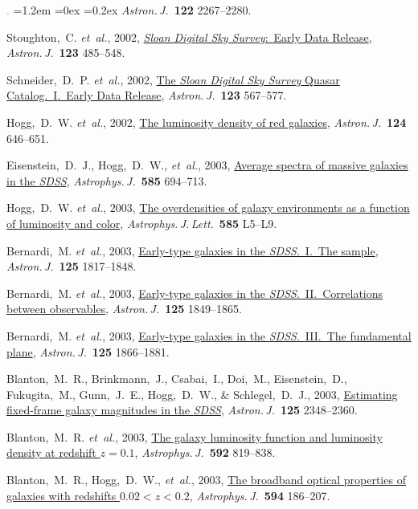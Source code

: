 \documentclass[10pt,letterpaper]{article}
\newcommand{\acronym}[1]{{\small{#1}}}
\newcommand{\foreign}[1]{\textsl{#1}}
\newcommand{\etal}{\foreign{et~al.}}
\newcommand{\project}[1]{\textsl{#1}}
\newcommand{\doi}[2]{\href{http://dx.doi.org/#1}{{#2}}}
\newcommand{\deemph}[1]{\textcolor{grey}{\footnotesize{#1}}}
\newcommand{\pubnumber}[1]{\deemph{{#1}.}}
\newcounter{refpubnum}
\newcommand{\hogglist}{%
    \rightmargin=0in
    \leftmargin=1.2em
    \topsep=0ex
    \partopsep=0pt
    \itemsep=0.2ex
    \parsep=0pt
    \itemindent=-1.0\leftmargin
    \listparindent=0.0\leftmargin
    \settowidth{\labelsep}{~}
    \usecounter{refpubnum}
  }
\begin{document}
\begin{list}{\pubnumber{\therefpubnum}}{\hogglist}
\textit{Astron.\,J.}\ \textbf{122} 2267--2280.
\item
Stoughton,~C. \etal, 2002,
\doi{10.1086/324741}{\project{Sloan Digital Sky Survey}:\ Early Data Release},
\textit{Astron.\,J.}\ \textbf{123} 485--548.
\item
Schneider,~D.~P. \etal, 2002,
\doi{10.1086/338434}{The \project{Sloan Digital Sky Survey} Quasar Catalog.\ \acronym{I}.\ Early Data Release},
\textit{Astron.\,J.}\ \textbf{123} 567--577.
\item
Hogg,~D.~W. \etal, 2002,
\doi{10.1086/341392}{The luminosity density of red galaxies},
\textit{Astron.\,J.}\ \textbf{124} 646--651.
\item
Eisenstein,~D.~J., Hogg,~D.~W., \etal, 2003,
\doi{10.1086/346233}{Average spectra of massive galaxies in the \project{\acronym{SDSS}}},
\textit{Astrophys.\,J.}\ \textbf{585} 694--713.
\item
Hogg,~D.~W. \etal, 2003,
\doi{10.1086/374238}{The overdensities of galaxy environments as a function of luminosity and color},
\textit{Astrophys.\,J.\,Lett.}\
\textbf{585} L5--L9.
\item
Bernardi,~M. \etal, 2003,
\doi{10.1086/367776}{Early-type galaxies in the \project{\acronym{SDSS}}.\ \acronym{I}.\ The sample},
\textit{Astron.\,J.}\ \textbf{125} 1817--1848.
\item
Bernardi,~M. \etal, 2003,
\doi{10.1086/374256}{Early-type galaxies in the \project{\acronym{SDSS}}.\ \acronym{II}.\ Correlations between observables},
\textit{Astron.\,J.}\ \textbf{125} 1849--1865.
\item
Bernardi,~M. \etal, 2003,
\doi{10.1086/367794}{Early-type galaxies in the \project{\acronym{SDSS}}.\ \acronym{III}.\ The fundamental plane},
\textit{Astron.\,J.}\ \textbf{125} 1866--1881.
\item
Blanton,~M.~R., Brinkmann,~J., Csabai,~I., Doi,~M., Eisenstein,~D., Fukugita,~M., Gunn,~J.~E., Hogg,~D.~W., \& Schlegel,~D.~J., 2003,
\doi{10.1086/342935}{Estimating fixed-frame galaxy magnitudes in the \project{\acronym{SDSS}}},
\textit{Astron.\,J.}\ \textbf{125} 2348--2360.
\item
Blanton,~M.~R. \etal, 2003,
\doi{10.1086/375776}{The galaxy luminosity function and luminosity density at redshift $z=0.1$},
\textit{Astrophys.\,J.}\ \textbf{592} 819--838.
\item
Blanton,~M.~R., Hogg,~D.~W., \etal, 2003,
\doi{10.1086/375528}{The broadband optical properties of galaxies with redshifts $0.02<z<0.2$},
\textit{Astrophys.\,J.}\ \textbf{594} 186--207.
\item

\end{list}
\end{document}
